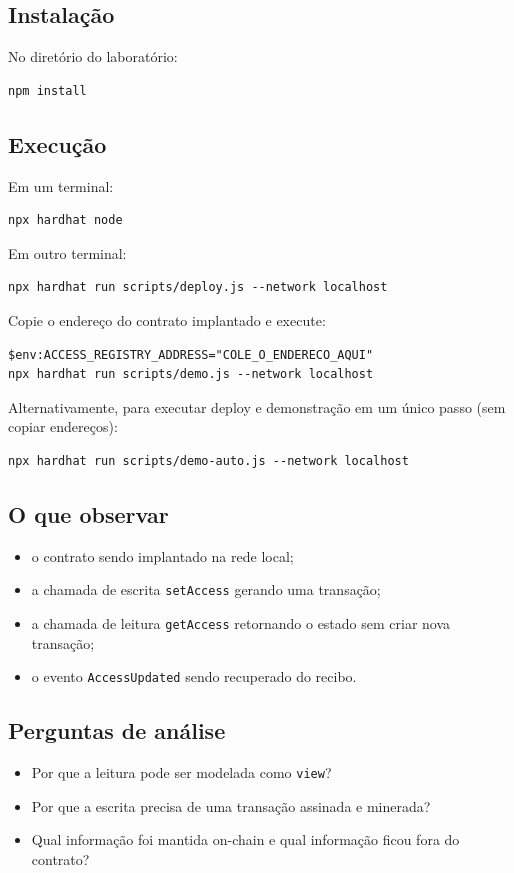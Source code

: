 \subsection{Instalação}
No diretório do laboratório:
\begin{verbatim}
npm install
\end{verbatim}

\subsection{Execução}
Em um terminal:
\begin{verbatim}
npx hardhat node
\end{verbatim}

Em outro terminal:
\begin{verbatim}
npx hardhat run scripts/deploy.js --network localhost
\end{verbatim}

Copie o endereço do contrato implantado e execute:
\begin{verbatim}
$env:ACCESS_REGISTRY_ADDRESS="COLE_O_ENDERECO_AQUI"
npx hardhat run scripts/demo.js --network localhost
\end{verbatim}

Alternativamente, para executar deploy e demonstração em um único passo (sem copiar endereços):
\begin{verbatim}
npx hardhat run scripts/demo-auto.js --network localhost
\end{verbatim}

\subsection{O que observar}
\begin{itemize}[leftmargin=*]
  \item o contrato sendo implantado na rede local;
  \item a chamada de escrita \texttt{setAccess} gerando uma transação;
  \item a chamada de leitura \texttt{getAccess} retornando o estado sem criar nova transação;
  \item o evento \texttt{AccessUpdated} sendo recuperado do recibo.
\end{itemize}

\subsection{Perguntas de análise}
\begin{itemize}[leftmargin=*]
  \item Por que a leitura pode ser modelada como \texttt{view}?
  \item Por que a escrita precisa de uma transação assinada e minerada?
  \item Qual informação foi mantida on-chain e qual informação ficou fora do contrato?
\end{itemize}

